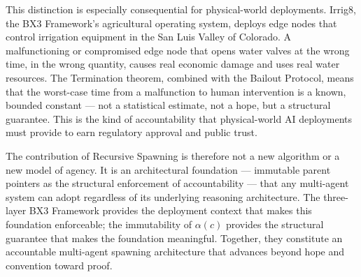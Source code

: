 This distinction is especially consequential for physical-world deployments. Irrig8, the BX3 Framework's agricultural operating system, deploys edge nodes that control irrigation equipment in the San Luis Valley of Colorado. A malfunctioning or compromised edge node that opens water valves at the wrong time, in the wrong quantity, causes real economic damage and uses real water resources. The Termination theorem, combined with the Bailout Protocol, means that the worst-case time from a malfunction to human intervention is a known, bounded constant — not a statistical estimate, not a hope, but a structural guarantee. This is the kind of accountability that physical-world AI deployments must provide to earn regulatory approval and public trust.

The contribution of Recursive Spawning is therefore not a new algorithm or a new model of agency. It is an architectural foundation — immutable parent pointers as the structural enforcement of accountability — that any multi-agent system can adopt regardless of its underlying reasoning architecture. The three-layer BX3 Framework provides the deployment context that makes this foundation enforceable; the immutability of $\alpha(c)$ provides the structural guarantee that makes the foundation meaningful. Together, they constitute an accountable multi-agent spawning architecture that advances beyond hope and convention toward proof.


